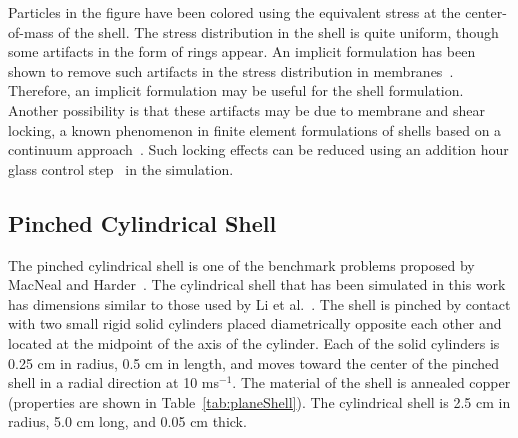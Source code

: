     Particles in the figure have been colored using the equivalent stress at the
    center-of-mass of the shell.  The stress distribution in the shell is quite 
    uniform, though some artifacts in the form of rings appear.  An implicit 
    formulation has been shown to remove such artifacts in the stress 
    distribution in membranes~\cite{Guilkey2002}.  Therefore, an implicit 
    formulation may be useful for the shell formulation.  Another possibility
    is that these artifacts may be due to membrane and shear locking, a known 
    phenomenon in finite element formulations of shells based on a continuum 
    approach~\cite{Belyt2000, Libai1998}.  Such locking effects can be reduced 
    using an addition hour glass control step~\cite{Belyt2000} in the simulation. 

    \subsection{Pinched Cylindrical Shell}
    The pinched cylindrical shell is one of the benchmark problems proposed
    by MacNeal and Harder~\cite{MacNeal1985}.  The cylindrical shell that has
    been simulated in this work has dimensions similar to those used by
    Li et al.~\cite{LiShaofan2000}.  The shell is pinched by contact with
    two small rigid solid cylinders placed diametrically opposite each other and
    located at the midpoint of the axis of the cylinder.  Each of the solid
    cylinders is 0.25 cm in radius, 0.5 cm in length, and moves toward the 
    center of the pinched shell in a radial direction at 10 ms$^{-1}$.  The 
    material of the shell is annealed copper (properties are shown in 
    Table~\ref{tab:planeShell}).  The cylindrical shell is 2.5 cm in radius,
    5.0 cm long, and 0.05 cm thick.
    
